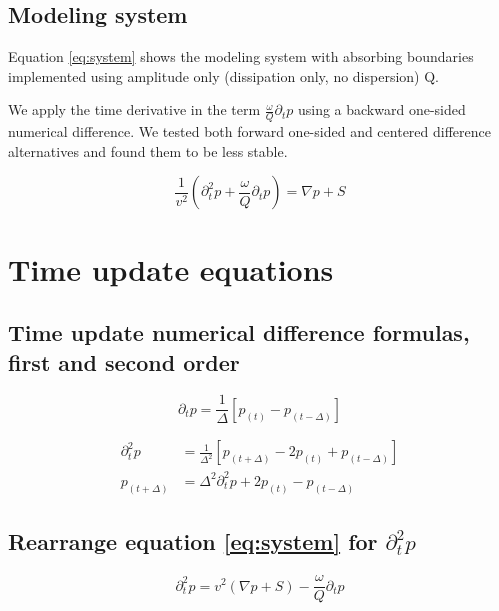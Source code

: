 \documentclass[10pt,fleqn]{article}
\begin{document}
\newpage
\subsection{Modeling system}
Equation \ref{eq:system} shows the modeling system with absorbing boundaries
implemented using amplitude only (dissipation only, no dispersion) Q.
\vspace{10pt}

We apply the time derivative in the term $\displaystyle \frac{\omega}{Q} \partial_t p$
using a backward one-sided numerical difference. We tested both forward one-sided
and centered difference alternatives and found them to be less stable.

\begin{equation}
\frac{1}{v^2} \left( \partial_t^2 p + \frac{\omega}{Q} \partial_t p \right) = \nabla p + S
\label{eq:system}
\end{equation}

\section{Time update equations}

\subsection{Time update numerical difference formulas, first and second order}
\begin{equation}
\partial_t p = \frac{1}{\Delta} \left[ p_{(t)} - p_{(t - \Delta)} \right]
\label{eq:diff1}
\end{equation}

\begin{equation}
\begin{aligned}
\partial_t^2 p &= \frac{1}{\Delta^2} \left[ p_{(t+\Delta)} - 2 p_{(t)} + p_{(t - \Delta)} \right] \\[10pt]
p_{(t+\Delta)} &= \Delta^2 \partial_t^2 p + 2 p_{(t)} - p_{(t - \Delta)}
\end{aligned}
\label{eq:diff2}
\end{equation}

\subsection{Rearrange equation \ref{eq:system} for $\partial_t^2 p$}
\begin{equation}
\partial_t^2 p = v^2 \left( \nabla p + S \right) - \frac{\omega}{Q} \partial_t p 
\end{equation}
\end{document}
